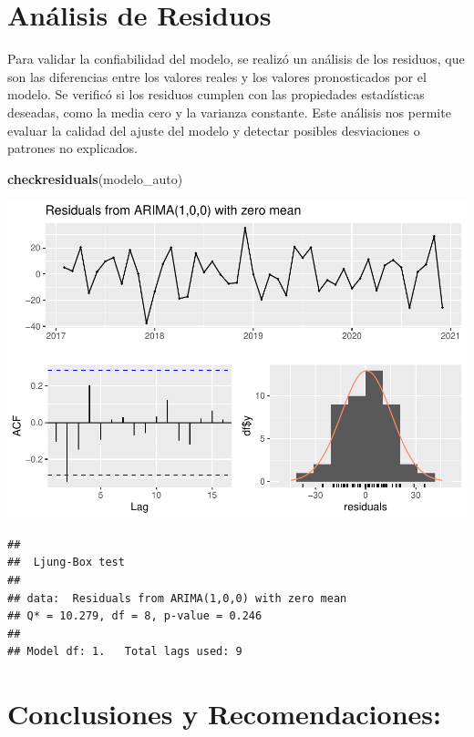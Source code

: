 \documentclass[
]{book}
\newenvironment{Shaded}{\begin{snugshade}}{\end{snugshade}}
\newcommand{\FunctionTok}[1]{\textcolor[rgb]{0.13,0.29,0.53}{\textbf{#1}}}
\newcommand{\NormalTok}[1]{#1}
\begin{document}
\section{\texorpdfstring{\textbf{Análisis de Residuos}}{Análisis de Residuos}}\label{anuxe1lisis-de-residuos}

Para validar la confiabilidad del modelo, se realizó un análisis de los residuos, que son las diferencias entre los valores reales y los valores pronosticados por el modelo. Se verificó si los residuos cumplen con las propiedades estadísticas deseadas, como la media cero y la varianza constante. Este análisis nos permite evaluar la calidad del ajuste del modelo y detectar posibles desviaciones o patrones no explicados.

\begin{Shaded}
\begin{Highlighting}[]
\FunctionTok{checkresiduals}\NormalTok{(modelo\_auto)}
\end{Highlighting}
\end{Shaded}

\includegraphics{_main_files/figure-latex/unnamed-chunk-32-1.pdf}

\begin{verbatim}
## 
##  Ljung-Box test
## 
## data:  Residuals from ARIMA(1,0,0) with zero mean
## Q* = 10.279, df = 8, p-value = 0.246
## 
## Model df: 1.   Total lags used: 9
\end{verbatim}

\section{\texorpdfstring{\textbf{Conclusiones y Recomendaciones:}}{Conclusiones y Recomendaciones:}}\label{conclusiones-y-recomendaciones-1}
\end{document}
